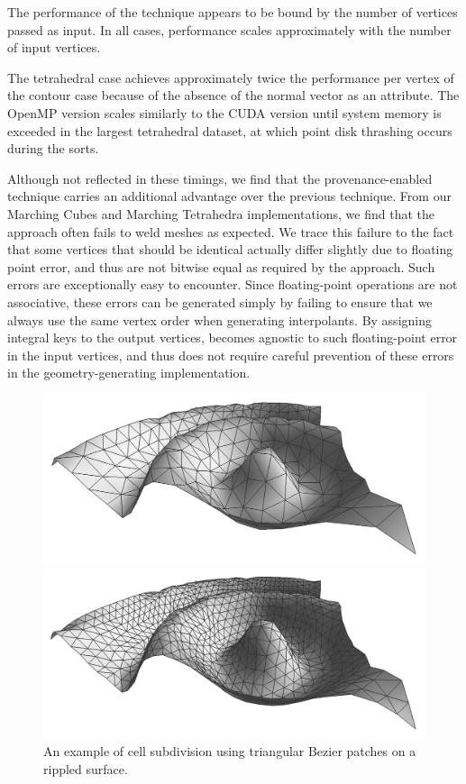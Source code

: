 \documentclass[10pt,journal,cspaper,compsoc]{IEEEtran}
\begin{document}
The performance of the technique appears to be bound by the number of vertices passed as input. In all cases, performance scales approximately with the number of input vertices. 

The tetrahedral case achieves approximately twice the performance per vertex of the contour case because of the absence of the normal vector as an attribute. The OpenMP version scales similarly to the CUDA version until system memory is exceeded in the largest tetrahedral dataset, at which point disk thrashing occurs during the sorts.

Although not reflected in these timings, we find that the
provenance-enabled technique carries an additional advantage over the
previous  technique. From our Marching Cubes and Marching
Tetrahedra implementations, we find that the  approach
often fails to weld meshes as expected. We trace this failure to the fact
that some vertices that should be identical actually differ slightly due to
floating point error, and thus are not bitwise equal as required by the
 approach. Such errors are exceptionally easy to
encounter. Since floating-point operations are not associative, these
errors can be generated simply by failing to ensure that we always use the
same vertex order when generating interpolants. By assigning integral keys
to the output vertices,  becomes agnostic to such
floating-point error in the input vertices, and thus does not require
careful prevention of these errors in the geometry-generating
implementation.

\begin{figure}[tb]
\centering
\includegraphics[width=\linewidth]{Subdivision0.png}

\includegraphics[width=\linewidth]{Subdivision1.png}
\caption{An example of cell subdivision using triangular Bezier patches on a rippled surface.}
\label{fig:cellsubdivision}
\end{figure}
\end{document}
